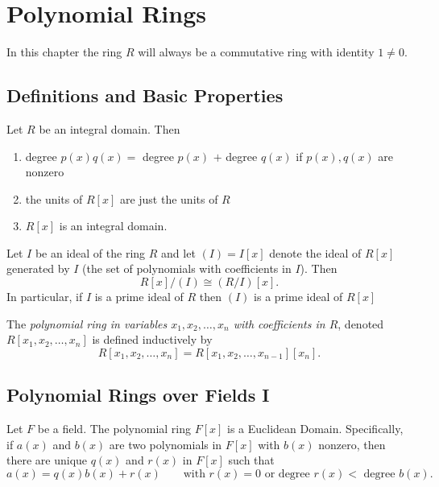 \documentclass[../main]{subfiles}
\begin{document}
 
\section{Polynomial Rings}

In this chapter the ring $R$ will always be a commutative ring with identity $1 \neq 0$.

\subsection{Definitions and Basic Properties}


\begin{prop}
 Let $R$ be an integral domain. Then 
 \begin{enumerate}
  \item degree $p(x) q(x) =$ degree $p(x)$ $+$ degree $q(x)$ if $p(x), q(x)$ are nonzero
  
  \item the units of $R[x]$ are just the units of $R$
  
  \item $R[x]$ is an integral domain.
 \end{enumerate}
\end{prop}


\begin{prop}
 Let $I$ be an ideal of the ring $R$ and let $(I) = I[x]$ denote the ideal of $R[x]$ generated by $I$ (the set of polynomials with coefficients in $I$). Then
 \[ R[x]/(I) \cong (R/I)[x]. \]
 In particular, if $I$ is a prime ideal of $R$ then $(I)$ is a prime ideal of $R[x]$
\end{prop}


\begin{dfn}
 The \textit{polynomial ring in variables $x_1, x_2, \ldots, x_n$ with coefficients in $R$}, denoted $R[x_1, x_2, \dots, x_n]$ is defined inductively by 
 \[ R[x_1, x_2, \dots, x_n] = R[x_1, x_2, \dots, x_{n-1}][x_n]. \]
\end{dfn}


\subsection{Polynomial Rings over Fields I}


\begin{thm}
 Let $F$ be a field. The polynomial ring $F[x]$ is a Euclidean Domain. Specifically, if $a(x)$ and $b(x)$ are two polynomials in $F[x]$ with $b(x)$ nonzero, then there are unique $q(x)$ and $r(x)$ in $F[x]$ such that 
 \[ a(x) = q(x) b(x) + r(x) \qquad \text{with } r(x) = 0 \text{ or degree } r(x) < \text{ degree } b(x). \]
\end{thm}
\end{document}
